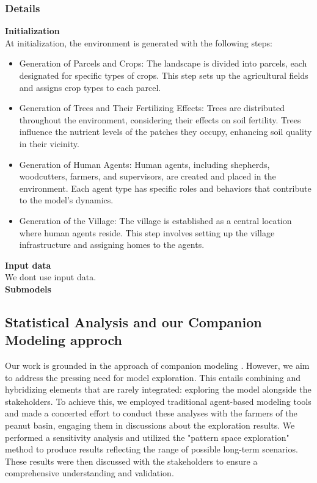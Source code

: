 \documentclass{article}
\begin{document}
    \subsubsection{Details}
        
        \textbf{Initialization}\\
        At initialization, the environment is generated with the following steps:

        \begin{itemize}
            \item Generation of Parcels and Crops: The landscape is divided into parcels, each designated for specific types of crops. This step sets up the agricultural fields and assigns crop types to each parcel.
            \item Generation of Trees and Their Fertilizing Effects: Trees are distributed throughout the environment, considering their effects on soil fertility. Trees influence the nutrient levels of the patches they occupy, enhancing soil quality in their vicinity.
            \item Generation of Human Agents: Human agents, including shepherds, woodcutters, farmers, and supervisors, are created and placed in the environment. Each agent type has specific roles and behaviors that contribute to the model's dynamics.
            \item Generation of the Village: The village is established as a central location where human agents reside. This step involves setting up the village infrastructure and assigning homes to the agents.
        \end{itemize}

        \textbf{Input data}\\

        We dont use input data.\\

        \textbf{Submodels}\\




\subsection{Statistical Analysis and our Companion Modeling approch}

Our work is grounded in the approach of companion modeling \parencite{barreteau_our_2003}. However, we aim to address the pressing need for model exploration. This entails combining and hybridizing elements that are rarely integrated: exploring the model alongside the stakeholders. To achieve this, we employed traditional agent-based modeling tools and made a concerted effort to conduct these analyses with the farmers of the peanut basin, engaging them in discussions about the exploration results. We performed a sensitivity analysis and utilized the "pattern space exploration" method to produce results reflecting the range of possible long-term scenarios. These results were then discussed with the stakeholders to ensure a comprehensive understanding and validation.
\end{document}
